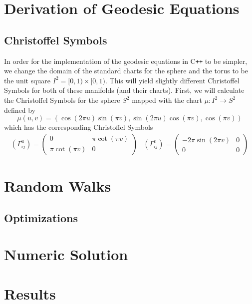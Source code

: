 \documentclass{article}
\begin{document}
\section{Derivation of Geodesic Equations}
	
	\subsection{Christoffel Symbols}
		In order for the implementation of the geodesic equations in C\texttt{++} to be simpler, we change the domain of the standard charts for the sphere and the torus to be the unit square $I^2 = [0,1) \times [0,1)$.
		This will yield slightly different Christoffel Symbols for both of these manifolds (and their charts).
		First, we will calculate the Christoffel Symbols for the sphere $S^2$ mapped with the chart $\mu:I^2 \to S^2$ defined by
		$$ \mu(u,v) = (\cos(2\pi u)\sin(\pi v), \sin(2\pi u)\cos(\pi v), \cos(\pi v)) $$
		which has the corresponding Christoffel Symbols
		\begin{equation}
			\begin{array}{lr}
			\left(\Gamma^{u}_{ij}\right) = \left( \begin{array}{cc}
					0 & \pi\cot(\pi v) \\
					\pi\cot(\pi v) & 0
				\end{array} \right) &
			\left(\Gamma^{v}_{ij}\right) = \left( \begin{array}{cc}
					-2\pi\sin(2\pi v) & 0 \\
					0 & 0
				\end{array} \right)
			\end{array}
		\end{equation}
	
\section{Random Walks}
	
	\subsection{Optimizations}

\section{Numeric Solution}

\section{Results}



\end{document}
